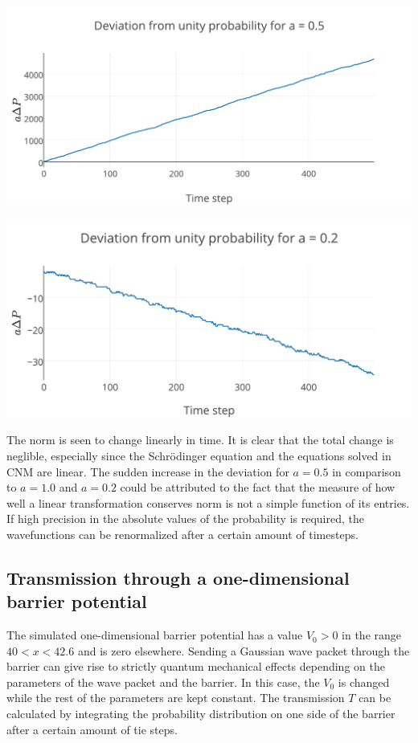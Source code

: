 \begin{Figure}
    \centering
    \includegraphics[width=\linewidth]{norma05.pdf}
    \label{fig:distancea05}
\end{Figure}

\begin{Figure}
    \centering
    \includegraphics[width=\linewidth]{norma02.pdf}
    \label{fig:distancea02}
\end{Figure} The norm is seen to change linearly in time. It is clear that the total change is neglible, especially since the Schr\"{o}dinger equation and the equations solved in CNM are linear. The sudden increase in the deviation for $a=0.5$ in comparison to $a=1.0$ and $a=0.2$ could be attributed to the fact that the measure of how well a linear transformation conserves norm is not a simple function of its entries. If high precision in the absolute values of the probability is required, the wavefunctions can be renormalized after a certain amount of timesteps.

\subsection*{Transmission through a one-dimensional barrier potential}
The simulated one-dimensional barrier potential has a value $V_0>0$ in the range $40<x<42.6$ and is zero elsewhere. Sending a Gaussian wave packet through the barrier can give rise to strictly quantum mechanical effects depending on the parameters of the wave packet and the barrier. In this case, the $V_0$ is changed while the rest of the parameters are kept constant. The transmission $T$ can be calculated by integrating the probability distribution on one side of the barrier after a certain amount of tie steps.

